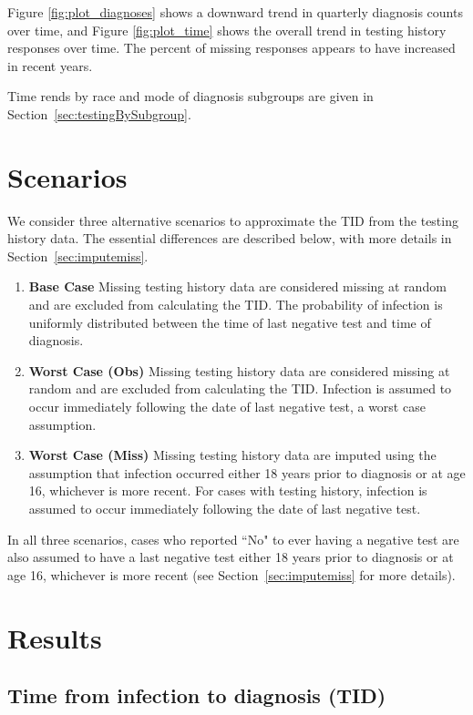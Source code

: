 \documentclass{article}\usepackage[]{graphicx}\usepackage[]{color}
\begin{document}
Figure \ref{fig:plot_diagnoses} shows a downward trend in quarterly diagnosis counts over time, and Figure \ref{fig:plot_time} shows the overall trend in testing history responses over time. The percent of missing responses appears to have increased in recent years.

Time rends by race and mode of diagnosis subgroups are given in Section~\ref{sec:testingBySubgroup}.

\section{Scenarios}
\label{sec:methods}

We consider three alternative scenarios to approximate the TID from the testing history data. The essential differences are described below, with more details in Section~\ref{sec:imputemiss}.

\begin{enumerate}
    \item \textbf{Base Case}  Missing testing history data are considered missing at random and are excluded from calculating the TID. The probability of infection is uniformly distributed between the time of last negative test and time of diagnosis.
    \item \textbf{Worst Case (Obs)} Missing testing history data are considered missing at random and are excluded from calculating the TID. Infection is assumed to occur immediately following the date of last negative test, a worst case assumption.
    \item \textbf{Worst Case (Miss)} Missing testing history data are imputed using the assumption that infection occurred either 18 years prior to diagnosis or at age 16, whichever is more recent. For cases with testing history, infection is assumed to occur immediately following the date of last negative test.
\end{enumerate}

In all three scenarios, cases who reported ``No" to ever having a negative test are also assumed to have a last negative test either 18 years prior to diagnosis or at age 16, whichever is more recent (see Section~\ref{sec:imputemiss} for more details). 
\section{Results}

\subsection{Time from infection to diagnosis (TID)}
\end{document}

